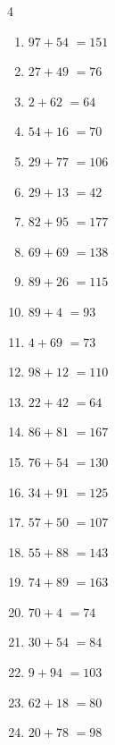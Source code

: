 \begin{multicols}{4}
\begin{enumerate}
  \item $97+54$
        $=151$

  \item $27+49$
        $=76$

  \item $2+62$
        $=64$

  \item $54+16$
        $=70$

  \item $29+77$
        $=106$

  \item $29+13$
        $=42$

  \item $82+95$
        $=177$

  \item $69+69$
        $=138$

  \item $89+26$
        $=115$

  \item $89+4$
        $=93$

  \item $4+69$
        $=73$

  \item $98+12$
        $=110$

  \item $22+42$
        $=64$

  \item $86+81$
        $=167$

  \item $76+54$
        $=130$

  \item $34+91$
        $=125$

  \item $57+50$
        $=107$

  \item $55+88$
        $=143$

  \item $74+89$
        $=163$

  \item $70+4$
        $=74$

  \item $30+54$
        $=84$

  \item $9+94$
        $=103$

  \item $62+18$
        $=80$

  \item $20+78$
        $=98$


\end{enumerate}
\end{multicols}
